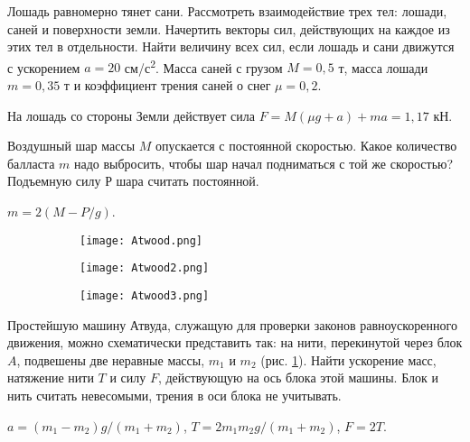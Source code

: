 \begin{ex} %
Лошадь равномерно тянет сани. Рассмотреть взаимодействие трех тел: лошади, саней и поверхности земли. Начертить векторы сил, действующих на каждое из этих тел в отдельности. Найти величину всех сил, если лошадь и сани движутся с ускорением $a = 20$ см/с\textsuperscript{2}. Масса саней с грузом $M = 0,5$ т, масса лошади $m = 0,35$ т и коэффициент трения саней о снег $\mu = 0,2$.
\begin{ans}
На лошадь со стороны Земли действует сила $F = M(\mu g + a) + ma = 1,17$ кН.
\end{ans}
\end{ex}

\begin{ex} %
Воздушный шар массы $M$ опускается с постоянной скоростью. Какое количество балласта $m$ надо выбросить, чтобы шар начал подниматься с той же скоростью? Подъемную силу $Р$ шара считать постоянной.
\begin{ans}
$m = 2(M - P/g)$.
\end{ans}
\end{ex}

\begin{figure}[h]
\centering
\begin{subfigure}[t]{.3\textwidth}
  \centering
  \texttt{[image: Atwood.png]}
  \caption{}
  \label{Atwood}
\end{subfigure}
\begin{subfigure}[t]{.3\textwidth}
  \centering
  \texttt{[image: Atwood2.png]}
  \caption{}
  \label{Atwood2}
\end{subfigure}
\begin{subfigure}[t]{.3\textwidth}
  \centering
  \texttt{[image: Atwood3.png]}
  \caption{}
  \label{Atwood3}
\end{subfigure}
\caption{}
\end{figure}

\begin{ex} %
Простейшую машину Атвуда, служащую для проверки законов равноускоренного движения, можно схематически представить так: на нити, перекинутой через блок $A$, подвешены две неравные массы, $m_1$
и $m_2$ (рис. \ref{Atwood}). Найти ускорение масс, натяжение нити $T$ и силу $F$, действующую на ось блока этой машины. Блок и нить считать невесомыми, трения в оси блока не учитывать.
\begin{ans}
$a = (m_1 - m_2)g / (m_1 + m_2)$, $T = 2 m_1 m_2 g /(m_1 + m_2)$, $F = 2T$.
\end{ans}
\end{ex}

